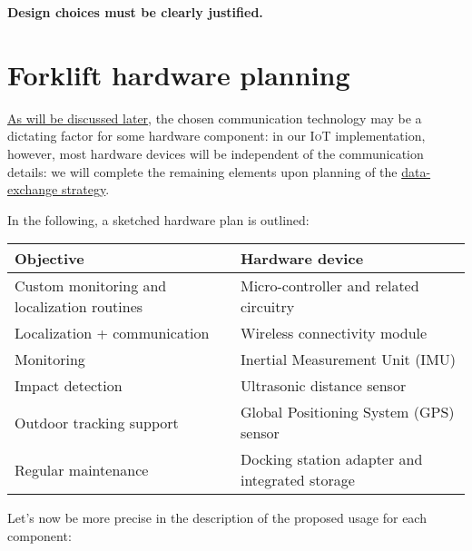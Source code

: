 \documentclass[a4paper,11pt]{article} %
\begin{document}
\textbf{Design choices must be clearly justified.}

\section{Forklift hardware planning}
\hyperref[communication]{As will be discussed later}, the chosen communication technology may be a dictating factor for some hardware component:
in our \textsc{IoT} implementation, however, most hardware devices will be independent of the communication details: we will complete the remaining elements upon planning of the \hyperref[data-exchange]{data-exchange strategy}.

\newpage

In the following, a sketched hardware plan is outlined:

\medskip

\begin{tabular}{|l|l|}
    \hline
    \textbf{Objective}        & \textbf{Hardware device}        \\
    \hline
    Custom monitoring and localization routines & Micro-controller and related circuitry \\
    \hline
    Localization + communication & Wireless connectivity module \\
    \hline
    Monitoring & Inertial Measurement Unit (IMU) \\
    \hline
    Impact detection & Ultrasonic distance sensor \\
    \hline
    Outdoor tracking support & Global Positioning System (GPS) sensor \\
    \hline
    Regular maintenance & Docking station adapter and integrated storage \\
    \hline
\end{tabular}

\medskip

Let's now be more precise in the description of the proposed usage for each component:
\end{document}

